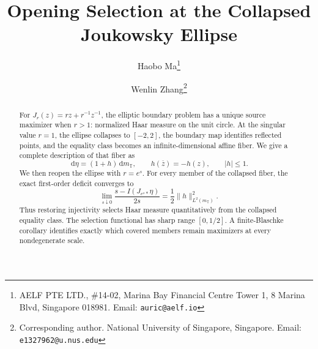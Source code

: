 \documentclass[12pt,a4paper]{article}
\title{Opening Selection at the Collapsed Joukowsky Ellipse}
\author{
  Haobo Ma\thanks{AELF PTE LTD., \#14-02, Marina Bay Financial Centre Tower 1, 8 Marina Blvd, Singapore 018981. Email: \texttt{auric@aelf.io}}
  \and
  Wenlin Zhang\thanks{Corresponding author. National University of Singapore, Singapore. Email: \texttt{e1327962@u.nus.edu}}
}
\date{}
\theoremstyle{plain}
\theoremstyle{definition}
\numberwithin{equation}{section}
\newcommand{\TT}{\mathbb{T}}
\newcommand{\dd}{\,\mathrm{d}}
\begin{document}
\maketitle

\begin{abstract}
For \(J_r(z)=rz+r^{-1}z^{-1}\), the elliptic boundary problem has a
unique source maximizer when \(r>1\): normalized Haar measure on the
unit circle.  At the singular value \(r=1\), the ellipse collapses to
\([-2,2]\), the boundary map identifies reflected points, and the
equality class becomes an infinite-dimensional affine fiber.  We give
a complete description of that fiber as
\[
 \dd\eta=(1+h)\dd m_{\TT},\qquad
 h(\overline z)=-h(z),\qquad |h|\leq1.
\]
We then reopen the ellipse with \(r=e^s\).  For every member of the
collapsed fiber, the exact first-order deficit converges to
\[
 \lim_{s\downarrow0}
 \frac{s-I(J_{e^s\ast}\eta)}{2s}
 =\frac12\lVert h\rVert_{L^2(m_{\TT})}^2.
\]
Thus restoring injectivity selects Haar measure quantitatively from the
collapsed equality class.  The selection functional has sharp range
\([0,1/2]\).  A finite-Blaschke corollary identifies exactly which
covered members remain maximizers at every nondegenerate scale.
\end{abstract}









\end{document}
